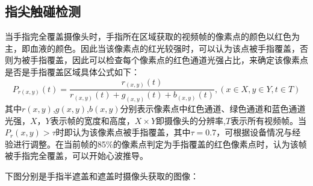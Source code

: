 \subsection{指尖触碰检测}
{
{当手指完全覆盖摄像头时，手指所在区域获取的视频帧的像素点的颜色以红色为主，即血液的颜色。因此当该像素点的红光较强时，可以认为该点被手指覆盖，否则为被手指覆盖，因此可以检查每个像素点的红色通道光强占比，来确定该像素点是否是手指覆盖区域具体公式如下：}
\begin{equation}
    P_{r(x,y)}(t)=\frac{r_{(x,y)}(t)}{r_{(x,y)}(t)+g_{(x,y)}(t)+b_{(x,y)}(t)},(x\in X,y\in Y,t\in T)
\end{equation}
{
其中$r(x,y)$,$g(x,y)$,$b(x,y)$分别表示像素点中红色通道、绿色通道和蓝色通道光强，$X$，$Y$表示帧的宽度和高度，$X\times Y$即摄像头的分辨率,$T$表示所有视频帧。当$P_r(x,y)>\tau$时即认为该像素点被手指覆盖，其中$\tau=0.7$，可根据设备情况与经验进行调整。在当前帧的85$\%$的像素点判定为手指覆盖的红色像素点时，认为该帧被手指完全覆盖，可以开始心波推导。
}
}
\par
{下图分别是手指半遮盖和遮盖时摄像头获取的图像：}
